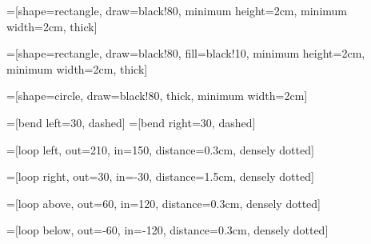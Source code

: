 
\usepackage{tikz}


=[shape=rectangle,
                draw=black!80,
                minimum height=2cm,
                minimum width=2cm,
                thick]

=[shape=rectangle,
                draw=black!80,
                fill=black!10,
                minimum height=2cm,
                minimum width=2cm,
                thick]

=[shape=circle,
                draw=black!80,
                thick,
                minimum width=2cm]
             
          	 
=[bend left=30, dashed]
=[bend right=30, dashed]

=[loop left, 
                   out=210, 
                   in=150, 
                   distance=0.3cm,
                   densely dotted]

=[loop right, 
                   out=30, 
                   in=-30, 
                   distance=1.5cm,
                   densely dotted]

=[loop above, 
                   out=60, 
                   in=120, 
                   distance=0.3cm,
                   densely dotted]

=[loop below, 
                   out=-60, 
                   in=-120, 
                   distance=0.3cm,
                   densely dotted]
